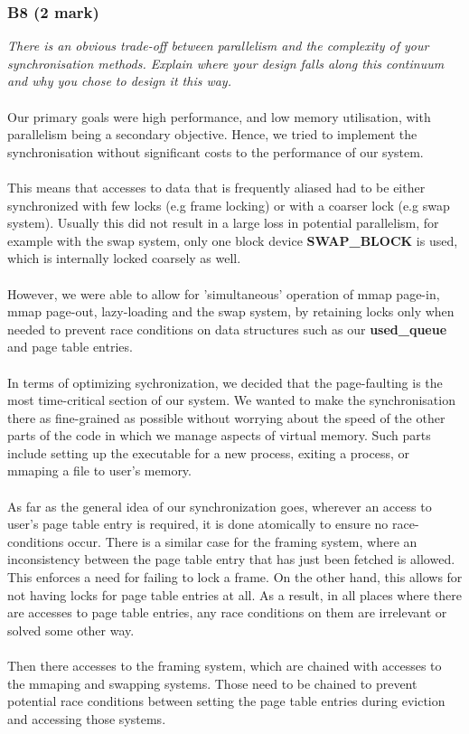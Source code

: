 \documentclass{report}
\newcommand{\question}[1]{\textit{#1} \ }
\newcommand{\var}[1]{\textcolor{RoyalPurple}{\textbf{#1}}}
\newcommand{\const}[1]{\textcolor{BrickRed}{\textbf{#1}}}
\begin{document}
			\subsubsection*{B8 (2 mark)}
				\question{There is an obvious trade-off between parallelism and the 
				complexity of your synchronisation methods. Explain where your design 
				falls along this continuum and why you chose to design it this way.}
				\\
				\\Our primary goals were high performance, and low memory utilisation, with parallelism 
				being a secondary objective. Hence, we tried to implement the synchronisation without significant costs
				to the performance of our system. 
				\\
				\\This means that accesses to data that is frequently aliased had to be either 
				synchronized with few locks (e.g frame locking) or with a coarser lock (e.g swap system).
				Usually this did not result in a large loss in potential parallelism, for example with 
				the swap system, only one block device \const{SWAP\_BLOCK} is used, which is internally locked coarsely as well.
				\\
				\\ However, we were able to allow for 'simultaneous' operation of mmap page-in, mmap page-out, 
				lazy-loading and the swap system, by retaining locks only when needed to prevent race conditions 
				on data structures such as our \var{used\_queue} and page table entries.
				\\
				\\In terms of optimizing sychronization, we decided that the page-faulting is the
				most time-critical section of our system. We wanted to make the synchronisation
				there as fine-grained as possible without worrying about the speed of the other parts of the
				code in which we manage aspects of virtual memory. Such parts include setting up
				the executable for a new process, exiting a process, or mmaping a file to user's memory.
				\\
				\\ As far as the general idea of our synchronization goes, wherever an access to user's page table entry is required,
				it is done atomically to ensure no race-conditions occur. There is a similar case for the framing system,
				where an inconsistency between the page table entry that has just been fetched is allowed. This enforces a need for
				failing to lock a frame. On the other hand, this allows for not having locks for page table entries at all. As a result, in all places
				where there are accesses to page table entries, any race conditions on them are irrelevant or solved some other way.
				\\
				\\Then there accesses to the framing system, which are chained with accesses to the mmaping and swapping systems.
				Those need to be chained to prevent potential race conditions between setting the page table entries during eviction and accessing those systems.
				
\end{document}
